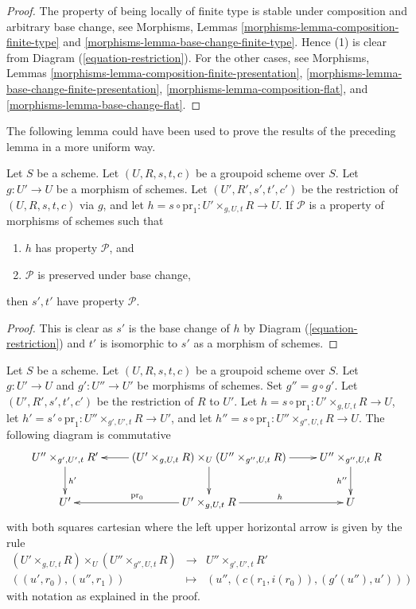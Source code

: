 \begin{proof}
The property of being locally of finite type is stable under composition
and arbitrary base change, see
Morphisms, Lemmas \ref{morphisms-lemma-composition-finite-type} and
\ref{morphisms-lemma-base-change-finite-type}.
Hence (1) is clear from Diagram (\ref{equation-restriction}).
For the other cases, see
Morphisms, Lemmas \ref{morphisms-lemma-composition-finite-presentation},
\ref{morphisms-lemma-base-change-finite-presentation},
\ref{morphisms-lemma-composition-flat}, and
\ref{morphisms-lemma-base-change-flat}.
\end{proof}

\noindent
The following lemma could have been used to prove the results of the preceding
lemma in a more uniform way.

\begin{lemma}
\label{lemma-restrict-property}
Let $S$ be a scheme.
Let $(U, R, s, t, c)$ be a groupoid scheme over $S$.
Let $g : U' \to U$ be a morphism of schemes.
Let $(U', R', s', t', c')$ be the restriction of
$(U, R, s, t, c)$ via $g$, and let
$h = s \circ \text{pr}_1 : U' \times_{g, U, t} R \to U$. If
$\mathcal{P}$ is a property of morphisms of schemes such that
\begin{enumerate}
\item $h$ has property $\mathcal{P}$, and
\item $\mathcal{P}$ is preserved under base change,
\end{enumerate}
then $s', t'$ have property $\mathcal{P}$.
\end{lemma}

\begin{proof}
This is clear as $s'$ is the base change of $h$ by
Diagram (\ref{equation-restriction})
and $t'$ is isomorphic to $s'$ as a morphism of schemes.
\end{proof}

\begin{lemma}
\label{lemma-double-restrict}
Let $S$ be a scheme.
Let $(U, R, s, t, c)$ be a groupoid scheme over $S$.
Let $g : U' \to U$ and $g' : U'' \to U'$ be morphisms of schemes.
Set $g'' = g \circ g'$.
Let $(U', R', s', t', c')$ be the restriction of $R$ to $U'$.
Let $h = s \circ \text{pr}_1 : U' \times_{g, U, t} R \to U$,
let $h' = s' \circ \text{pr}_1 : U'' \times_{g', U', t} R \to U'$, and
let $h'' = s \circ \text{pr}_1 : U'' \times_{g'', U, t} R \to U$.
The following diagram is commutative
$$
\xymatrix{
U'' \times_{g', U', t} R' \ar[d]^{h'} &
(U' \times_{g, U, t} R) \times_U (U'' \times_{g'', U, t} R)
\ar[l] \ar[r] \ar[d] &
U'' \times_{g'', U, t} R \ar[d]_{h''} \\
U' &
U' \times_{g, U, t} R \ar[l]_{\text{pr}_0} \ar[r]^h &
U
}
$$
with both squares cartesian where the left upper horizontal arrow
is given by the rule
$$
\begin{matrix}
(U' \times_{g, U, t} R) \times_U (U'' \times_{g'', U, t} R) &
\longrightarrow &
U'' \times_{g', U', t} R' \\
((u', r_0), (u'', r_1)) &
\longmapsto &
(u'', (c(r_1, i(r_0)), (g'(u''), u')))
\end{matrix}
$$
with notation as explained in the proof.
\end{lemma}

